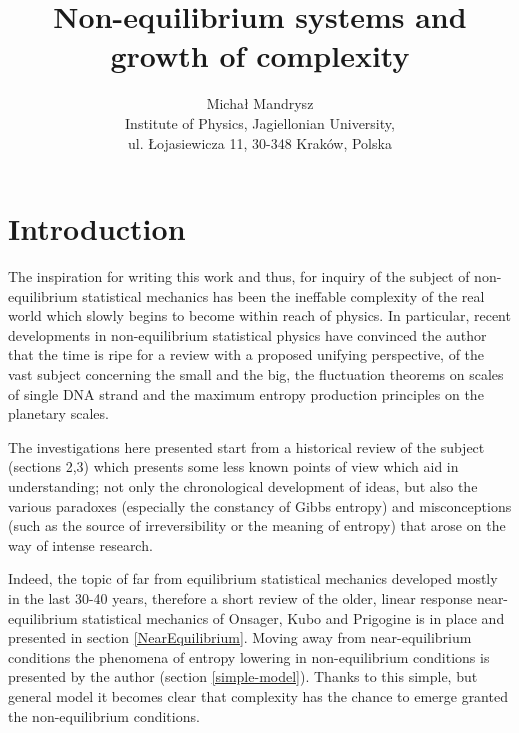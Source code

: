 \documentclass[a4paper,12pt]{article}
\begin{document}
\newpage\thispagestyle{empty}
\mbox{}
\newpage
\pagebreak








\title{Non-equilibrium systems and growth of complexity}

\author{Michał Mandrysz \\
Institute of Physics, Jagiellonian University, \\ul. Łojasiewicza
11, 30-348 Kraków, Polska }


\tableofcontents

\newpage
\setcounter{page}{1}
\pagestyle{plain}
\section{Introduction}

The inspiration for writing this work and thus, for inquiry of the subject of non-equilibrium statistical mechanics has been the ineffable complexity of the real world which slowly begins to become within reach of physics. 
In particular, recent developments in non-equilibrium statistical physics have convinced the author that the time is ripe for a review with a proposed unifying perspective, of the vast subject concerning the small and the big, the fluctuation theorems on scales of single DNA strand and the maximum entropy production principles on the planetary scales. 

The investigations here presented start from a historical review of the subject (sections 2,3) which presents some less known points of view which aid in understanding; not only the chronological development of ideas, but also the various paradoxes (especially the constancy of Gibbs entropy) and misconceptions (such as the source of irreversibility or the meaning of entropy) that arose on the way of intense research. 

Indeed, the topic of far from equilibrium statistical mechanics developed mostly in the last 30-40 years, therefore a short review of the older, linear response near-equilibrium statistical mechanics of Onsager, Kubo and Prigogine is in place and presented in section \ref{NearEquilibrium}. 
Moving away from near-equilibrium conditions the phenomena of entropy lowering in non-equilibrium conditions is presented by the author (section \ref{simple-model}). Thanks to this simple, but general model it becomes clear that complexity has the chance to emerge granted the non-equilibrium conditions.
\end{document}
